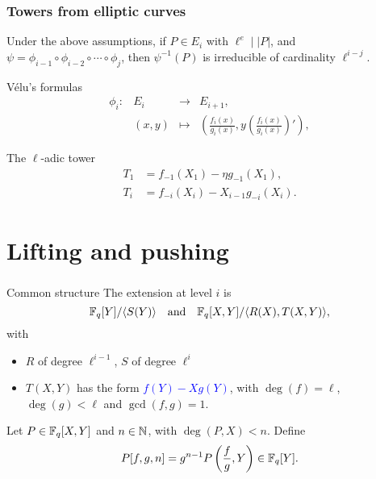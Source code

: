 \documentclass[10pt]{beamer}
\begin{document}

\begin{frame}
	\frametitle{Towers from elliptic curves}
	
	Under the above assumptions, if $P \in E_i$ with $\ell^e \mid \lvert P \rvert$, and $\psi=\phi_{i-1}\circ\phi_{i-2}\circ\cdots\circ\phi_{j}$, then $\psi^{-1}(P)$ is irreducible of cardinality $\ell^{i-j}$.
	\vspace*{5mm}
	\begin{exampleblock}{V\'elu's formulas}
		\begin{equation*}
		  \begin{array}{crcl}
		    \phi_i: & E_i &\longrightarrow & E_{i+1},\\
		    & (x,y) &\longmapsto & \left(\frac{f_i(x)}{g_i(x)}, y\left(\frac{f_i(x)}{g_i(x)}\right)'\right),
		  \end{array}
		\end{equation*}
	\end{exampleblock}
	
	\begin{block}{The $\ell$-adic tower}
		\begin{align*}
		  T_1 &= f_{-1}(X_1) - \eta g_{-1}(X_1),\\ 
		  T_i &= f_{-i}(X_i) - X_{i-1} g_{-i}(X_i).
		\end{align*}
	\end{block}
\end{frame}


\section{Lifting and pushing}

\begin{frame}
	\frametitle{\insertsection}
	
	\begin{block}{Common structure}
		The	extension at level $i$ is
		$$\mathbb{F}_q[Y]/ \langle S(Y) \rangle \quad\text{and}\quad \mathbb{F}_q[X,Y]/\langle R(X), T(X,Y) \rangle,$$
		with 
		\begin{itemize}
			\item $R$ of degree $\ell^{i-1}$, $S$ of degree	$\ell^i$
			\item $T(X,Y)$ has the form \textcolor{blue}{$f(Y)-X g(Y)$}, with $\deg(f)=\ell$, $\deg(g) < \ell$ and $\gcd(f,g)=1$.
		\end{itemize}
	\end{block}
	
	\begin{definition}
		Let $P \in \mathbb{F}_q[X,Y]$ and $n \in \mathbb{N}$, with $\deg(P,X)< n$. Define
		$$P[f,g,n] = g^{n-1} P\left (\frac fg, Y\right) \in \mathbb{F}_q[Y].$$
	\end{definition}
\end{frame}
\end{document}

